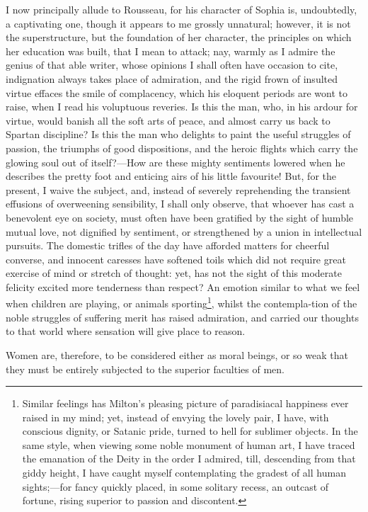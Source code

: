 I now principally allude to Rousseau, for his character of Sophia is,
undoubtedly, a captivating one, though it appears to me grossly
unnatural; however, it is not the superstructure, but the foundation
of her character, the principles on which her education was built,
that I mean to attack; nay, warmly as I admire the genius of that able
writer, whose opinions I shall often have occasion to cite,
indignation always takes place of admiration, and the rigid frown of
insulted virtue effaces the smile of complacency, which his eloquent
periods are wont to raise, when I read his voluptuous reveries. Is
this the man, who, in his ardour for virtue, would banish all the soft
arts of peace, and almost carry us back to Spartan discipline? Is this
the man who delights to paint the useful struggles of passion, the
triumphs  of good dispositions, and the heroic flights which
carry the glowing soul out of itself?---How are these mighty
sentiments lowered when he describes the pretty foot and enticing airs
of his little favourite! But, for the present, I waive the subject,
and, instead of severely reprehending the transient effusions of
overweening sensibility, I shall only observe, that whoever has cast
a benevolent eye on society, must often have been gratified by the
sight of humble mutual love, not dignified by sentiment, or
strengthened by a union in intellectual pursuits. The domestic trifles
of the day have afforded matters for cheerful converse, and innocent
caresses have softened toils which did not require great exercise of
mind or stretch of thought: yet, has not the sight of this moderate
felicity excited more tenderness than respect? An emotion similar to
what we feel when children are playing, or animals
sporting\footnote{Similar feelings has Milton's pleasing picture of
paradisiacal happiness ever raised in my mind; yet, instead of envying
the lovely pair, I have, with conscious dignity, or Satanic pride,
turned to hell for sublimer objects. In the same style, when viewing
some noble monument of human art, I have traced the emanation of the
Deity in the order I admired, till, descending from that giddy height,
I have caught myself contemplating the gradest of all human
sights;---for fancy quickly placed, in some solitary recess, an
outcast of fortune, rising superior to passion and discontent.},
whilst the contempla-tion of the noble struggles of suffering
merit has raised admiration, and carried our thoughts to that world
where sensation will give place to reason.

Women are, therefore, to be considered either as moral beings, or so
weak that they must be entirely subjected to the superior faculties of
men.

